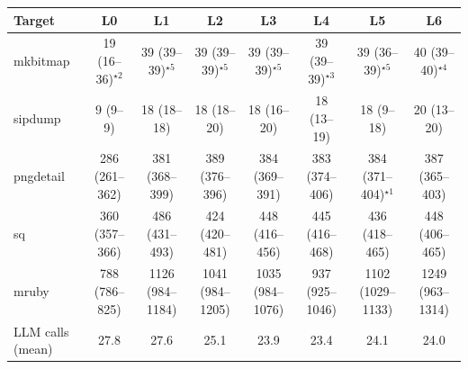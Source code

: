 \begin{tabular}{lccccccc}
\toprule
Target & L0 & L1 & L2 & L3 & L4 & L5 & L6 \\
\midrule
mkbitmap & 19 (16--36)$^{\star2}$ & 39 (39--39)$^{\star5}$ & 39 (39--39)$^{\star5}$ & 39 (39--39)$^{\star5}$ & 39 (39--39)$^{\star3}$ & 39 (36--39)$^{\star5}$ & 40 (39--40)$^{\star4}$ \\
sipdump & 9 (9--9) & 18 (18--18) & 18 (18--20) & 18 (16--20) & 18 (13--19) & 18 (9--18) & 20 (13--20) \\
pngdetail & 286 (261--362) & 381 (368--399) & 389 (376--396) & 384 (369--391) & 383 (374--406) & 384 (371--404)$^{\star1}$ & 387 (365--403) \\
sq & 360 (357--366) & 486 (431--493) & 424 (420--481) & 448 (416--456) & 445 (416--468) & 436 (418--465) & 448 (406--465) \\
mruby & 788 (786--825) & 1126 (984--1184) & 1041 (984--1205) & 1035 (984--1076) & 937 (925--1046) & 1102 (1029--1133) & 1249 (963--1314) \\
\midrule
LLM calls (mean) & 27.8 & 27.6 & 25.1 & 23.9 & 23.4 & 24.1 & 24.0 \\
\bottomrule
\end{tabular}
